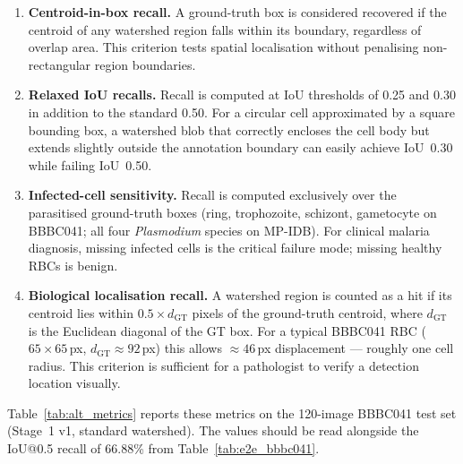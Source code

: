\documentclass[review,12pt]{elsarticle}
\begin{document}
\begin{enumerate}[leftmargin=*, label=\textbf{M\arabic*.}]

  \item \textbf{Centroid-in-box recall.}  A ground-truth box is considered
  recovered if the centroid of any watershed region falls within its boundary,
  regardless of overlap area.  This criterion tests spatial localisation
  without penalising non-rectangular region boundaries.

  \item \textbf{Relaxed IoU recalls.}  Recall is computed at IoU thresholds
  of 0.25 and 0.30 in addition to the standard 0.50.  For a circular cell
  approximated by a square bounding box, a watershed blob that correctly
  encloses the cell body but extends slightly outside the annotation boundary
  can easily achieve IoU~0.30 while failing IoU~0.50.

  \item \textbf{Infected-cell sensitivity.}  Recall is computed exclusively
  over the parasitised ground-truth boxes (ring, trophozoite, schizont,
  gametocyte on BBBC041; all four \textit{Plasmodium} species on MP-IDB).
  For clinical malaria diagnosis, missing infected cells is the critical
  failure mode; missing healthy RBCs is benign.

  \item \textbf{Biological localisation recall.}  A watershed region is
  counted as a hit if its centroid lies within $0.5 \times d_{\text{GT}}$
  pixels of the ground-truth centroid, where $d_{\text{GT}}$ is the
  Euclidean diagonal of the GT box.  For a typical BBBC041 RBC
  ($65 \times 65$\,px, $d_{\text{GT}} \approx 92$\,px) this allows
  $\approx 46$\,px displacement --- roughly one cell radius.  This criterion
  is sufficient for a pathologist to verify a detection location visually.

\end{enumerate}

Table~\ref{tab:alt_metrics} reports these metrics on the 120-image BBBC041
test set (Stage~1 v1, standard watershed).  The values should be read
alongside the IoU@0.5 recall of 66.88\% from Table~\ref{tab:e2e_bbbc041}.
\end{document}
